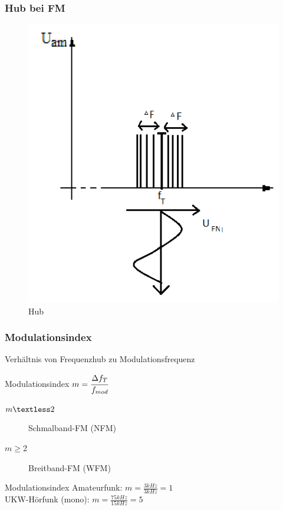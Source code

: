 \begin{frame}
\frametitle{Hub bei FM}
\begin{center}
  \begin{figure}
      \includegraphics[width=\textwidth,height=.75\textheight,keepaspectratio]{e14/Hub.png}
      \caption{Hub}  %
    \end{figure}
\end{center}
\end{frame}

\begin{frame}
  \frametitle{Modulationsindex}
  Verhältnis von Frequenzhub zu Modulationsfrequenz
  \begin{block}{Modulationsindex}
    $m = \cfrac{\Delta f_T}{f_{mod}}$
  \end{block}
  \begin{description}
    \item[$m\textless2$] Schmalband-FM (NFM)
    \item[$m\geq$2] Breitband-FM (WFM)
  \end{description}
  \begin{exampleblock}{Modulationsindex}
    Amateurfunk: $m = \frac{3kHz}{3kHz} = 1$\\
    UKW-Hörfunk (mono): $m = \frac{75kHz}{15kHz} = 5$\\
  \end{exampleblock}
\end{frame}

